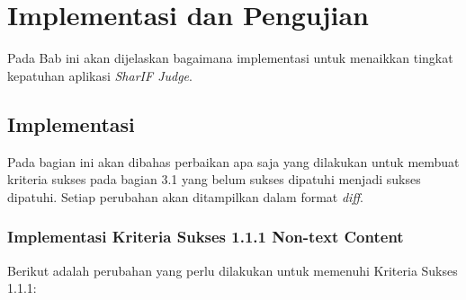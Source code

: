 \chapter{Implementasi dan Pengujian}
\label{chap:implementasi}

Pada Bab ini akan dijelaskan bagaimana implementasi untuk menaikkan tingkat kepatuhan aplikasi \textit{SharIF Judge}.

\section{Implementasi}
\label{sec:implementasi}

Pada bagian ini akan dibahas perbaikan apa saja yang dilakukan untuk membuat kriteria sukses pada bagian 3.1
yang belum sukses dipatuhi menjadi sukses dipatuhi. Setiap perubahan akan ditampilkan dalam format \textit{diff}.

\subsection{Implementasi Kriteria Sukses 1.1.1 Non-text Content}
\label{subsec:implementasi_A_1.1.1}

Berikut adalah perubahan yang perlu dilakukan untuk memenuhi Kriteria Sukses 1.1.1:

